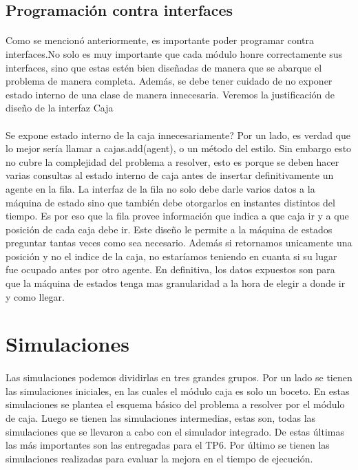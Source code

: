 \documentclass{article}
\begin{document}
\subsection{Programación contra interfaces}

\paragraph{}
Como se mencionó anteriormente, es importante poder programar contra interfaces.No solo es muy importante que cada módulo honre correctamente sus interfaces, sino que estas estén bien diseñadas de manera que se abarque el problema de manera completa. Además, se debe tener cuidado de no exponer estado interno de una clase de manera innecesaria. Veremos la justificación de diseño de la interfaz Caja

\paragraph{}
Se expone estado interno de la caja innecesariamente? Por un lado, es verdad que lo mejor sería llamar a cajas.add(agent), o un método del estilo. Sin embargo esto no cubre la complejidad del problema a resolver, esto es porque se deben hacer varias consultas al estado interno de caja antes de insertar definitivamente un agente en la fila. La interfaz de la fila no solo debe darle varios datos a la máquina de estado sino que también debe otorgarlos en instantes distintos del tiempo. Es por eso que la fila provee información que indica a que caja ir y a que posición de cada caja debe ir. Este diseño le permite a la máquina de estados preguntar tantas veces como sea necesario. Además si retornamos unicamente una posición y no el indice de la caja, no estaríamos teniendo en cuanta si su lugar fue ocupado antes por otro agente. En definitiva, los datos expuestos son para que la máquina de estados tenga mas granularidad a la hora de elegir a donde ir y como llegar.

\section{Simulaciones}
\paragraph{}
Las simulaciones podemos dividirlas en tres grandes grupos. Por un lado se tienen las simulaciones iniciales, en las cuales el módulo caja es solo un boceto. En estas simulaciones se plantea el esquema básico del problema a resolver por el módulo de caja.
Luego se tienen las simulaciones intermedias, estas son, todas las simulaciones que se llevaron a cabo con el simulador integrado. De estas últimas las más importantes son las entregadas para el TP6. Por último se tienen las simulaciones realizadas para evaluar la mejora en el tiempo de ejecución.
\end{document}
